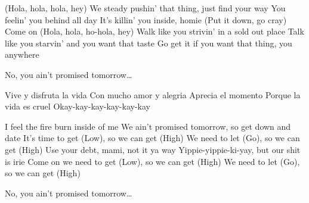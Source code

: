 \beginverse
(Hola, hola, hola, hey) \brk
We steady pushin' that thing, just find your way \brk
You feelin' you behind all day \brk
It's killin' you inside, homie (Put it down, go cray) \brk
Come on \brk
(Hola, hola, ho-hola, hey) \brk
Walk like you strivin' in a sold out place \brk
Talk like you starvin' and you want that taste \brk
Go get it if you want that thing, you anywhere
\endverse

\beginchorus
{} No, you ain't promised tomorrow\ldots
\endchorus

\beginverse
Vive y disfruta la vida \brk
Con mucho amor y alegria \brk
Aprecia el momento \brk
Porque la vida es cruel \brk
Okay-kay-kay-kay-kay-kay
\endverse

\beginverse
I feel the fire burn inside of me \brk
We ain't promised tomorrow, so get down and date \brk
It's time to get (Low), so we can get (High) \brk
We need to let (Go), so we can get (High) \brk
Use your debt, mami, not it ya way \brk
Yippie-yippie-ki-yay, but our shit is irie \brk
Come on we need to get (Low), so we can get (High) \brk
We need to let (Go), so we can get (High)
\endverse

\beginchorus
{} No, you ain't promised tomorrow\ldots
\endchorus

\endsong
